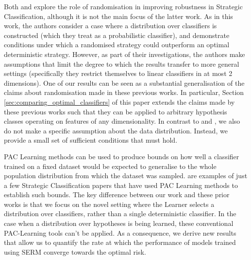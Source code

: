 Both \cite{braverman2020} and \cite{sundaram2023} explore the role of randomisation in improving robustness in Strategic Classification, although it is not the main focus of the latter work. As in this work, the authors consider a case where a distribution over classifiers is constructed (which they treat as a probabilistic classifier), and demonstrate conditions under which a randomised strategy could outperform an optimal deterministic strategy. However, as part of their investigations, the authors make assumptions that limit the degree to which the results transfer to more general settings (specifically they restrict themselves to linear classifiers in at most 2 dimensions). One of our results can be seen as a substantial generalisation of the claims about randomisation made in these previous works. In particular, Section \ref{sec:comparing_optimal_classifiers} of this paper extends the claims made by these previous works such that they can be applied to arbitrary hypothesis classes operating on features of any dimensionality. In contrast to \citet{braverman2020} and \citet{sundaram2023}, we also do not make a specific assumption about the data distribution. Instead, we provide a small set of sufficient conditions that must hold.

PAC Learning methods \citep{valiant1984} can be used to produce bounds on how well a classifier trained on a fixed dataset would be expected to generalise to the whole population distribution from which the dataset was sampled. \citet{zhang2021, sundaram2023, cullina2018} are examples of just a few Strategic Classification papers that have used PAC Learning methods to establish such bounds. The key difference between our work and these prior works is that we focus on the novel setting where the Learner selects a distribution over classifiers, rather than a single deterministic classifier. In the case when a distribution over hypotheses is being learned, these conventional PAC-Learning tools can't be applied. As a consequence, we derive new results that allow us to quantify the rate at which the performance of models trained using SERM converge towards the optimal risk.

